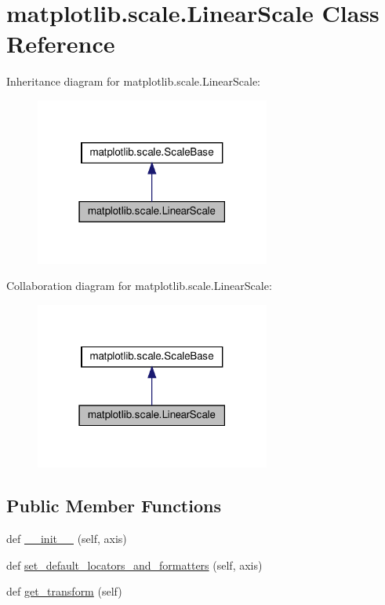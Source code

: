 \hypertarget{classmatplotlib_1_1scale_1_1LinearScale}{}\section{matplotlib.\+scale.\+Linear\+Scale Class Reference}
\label{classmatplotlib_1_1scale_1_1LinearScale}


Inheritance diagram for matplotlib.\+scale.\+Linear\+Scale\+:
\nopagebreak
\begin{figure}[H]
\begin{center}
\leavevmode
\includegraphics[width=219pt]{classmatplotlib_1_1scale_1_1LinearScale__inherit__graph}
\end{center}
\end{figure}


Collaboration diagram for matplotlib.\+scale.\+Linear\+Scale\+:
\nopagebreak
\begin{figure}[H]
\begin{center}
\leavevmode
\includegraphics[width=219pt]{classmatplotlib_1_1scale_1_1LinearScale__coll__graph}
\end{center}
\end{figure}
\subsection*{Public Member Functions}
\begin{DoxyCompactItemize}
\item 
def \hyperlink{classmatplotlib_1_1scale_1_1LinearScale_a23fd987f77470b36c74bb32b67b0322e}{\+\_\+\+\_\+init\+\_\+\+\_\+} (self, axis)
\item 
def \hyperlink{classmatplotlib_1_1scale_1_1LinearScale_a766842367873efad466bbd168ccdbb0e}{set\+\_\+default\+\_\+locators\+\_\+and\+\_\+formatters} (self, axis)
\item 
def \hyperlink{classmatplotlib_1_1scale_1_1LinearScale_a6e103deab3613efbf3f49c40dbe1d475}{get\+\_\+transform} (self)
\end{DoxyCompactItemize}
